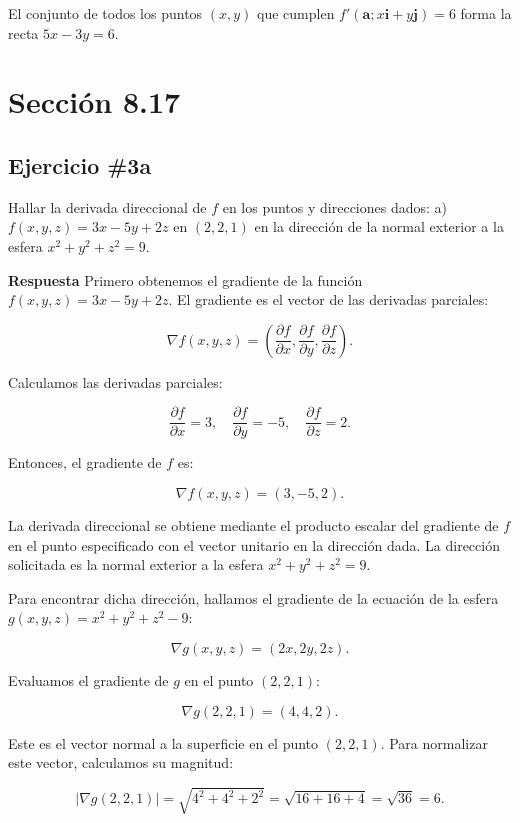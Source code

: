 \documentclass{report}
\begin{document}
    El conjunto de todos los puntos $(x, y)$ que cumplen $f'(\boldsymbol{a}; x \boldsymbol{i} + y \boldsymbol{j}) = 6$ forma la recta $5x - 3y = 6$.

    \newpage
    \section*{Sección 8.17}
    \subsection*{Ejercicio \#3a}
    Hallar la derivada direccional de $f$ en los puntos y direcciones dados:
    a) $f(x, y, z)=3 x-5 y+2 z$ en $(2,2,1)$ en la dirección de la normal exterior a la esfera $x^{2}+y^{2}+z^{2}=9$.

    \textbf{Respuesta}
    Primero obtenemos el gradiente de la función \( f(x, y, z) = 3x - 5y + 2z \). El gradiente es el vector de las derivadas parciales:

    \[
    \nabla f(x, y, z) = \left( \frac{\partial f}{\partial x}, \frac{\partial f}{\partial y}, \frac{\partial f}{\partial z} \right).
    \]

    Calculamos las derivadas parciales:

    \[
    \frac{\partial f}{\partial x} = 3, \quad \frac{\partial f}{\partial y} = -5, \quad \frac{\partial f}{\partial z} = 2.
    \]

    Entonces, el gradiente de \( f \) es:

    \[
    \nabla f(x, y, z) = (3, -5, 2).
    \]

    La derivada direccional se obtiene mediante el producto escalar del gradiente de \( f \) en el punto especificado con el vector unitario en la dirección dada. La dirección solicitada es la normal exterior a la esfera \( x^2 + y^2 + z^2 = 9 \).

    Para encontrar dicha dirección, hallamos el gradiente de la ecuación de la esfera \( g(x, y, z) = x^2 + y^2 + z^2 - 9 \):

    \[
    \nabla g(x, y, z) = (2x, 2y, 2z).
    \]

    Evaluamos el gradiente de \( g \) en el punto \( (2, 2, 1) \):

    \[
    \nabla g(2, 2, 1) = (4, 4, 2).
    \]

    Este es el vector normal a la superficie en el punto \( (2, 2, 1) \). Para normalizar este vector, calculamos su magnitud:

    \[
    |\nabla g(2, 2, 1)| = \sqrt{4^2 + 4^2 + 2^2} = \sqrt{16 + 16 + 4} = \sqrt{36} = 6.
    \]
\end{document}
